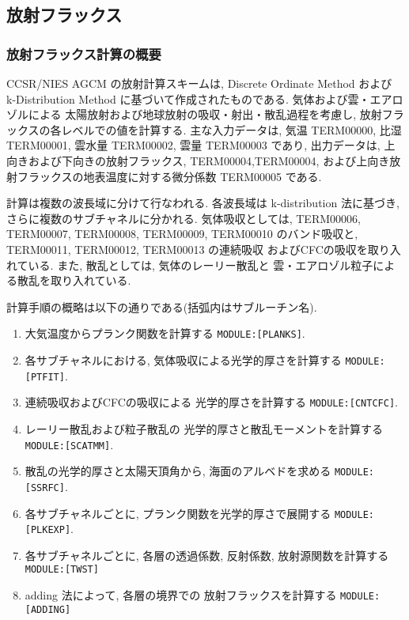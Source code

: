 ﻿\subsection{放射フラックス}

\subsubsection{放射フラックス計算の概要}

CCSR/NIES AGCM の放射計算スキームは, 
Discrete Ordinate Method および 
k-Distribution Method に基づいて作成されたものである.
気体および雲・エアロゾルによる
太陽放射および地球放射の吸収・射出・散乱過程を考慮し,
放射フラックスの各レベルでの値を計算する.
主な入力データは, 気温 TERM00000, 比湿 TERM00001, 雲水量 TERM00002, 雲量 TERM00003 であり,
出力データは, 上向きおよび下向きの放射フラックス, TERM00004,TERM00004,
および上向き放射フラックスの地表温度に対する微分係数
TERM00005 である.

計算は複数の波長域に分けて行なわれる.
各波長域は k-distribution 法に基づき,
さらに複数のサブチャネルに分かれる.
気体吸収としては, 
TERM00006, TERM00007, TERM00008, TERM00009, TERM00010 のバンド吸収と,
TERM00011, TERM00012, TERM00013 の連続吸収
およびCFCの吸収を取り入れている.
また, 散乱としては, 気体のレーリー散乱と
雲・エアロゾル粒子による散乱を取り入れている.

計算手順の概略は以下の通りである(括弧内はサブルーチン名).
%
\begin{enumerate}
\item 大気温度からプランク関数を計算する \texttt{MODULE:[PLANKS]}.
\item 各サブチャネルにおける,
      気体吸収による光学的厚さを計算する \texttt{MODULE:[PTFIT]}.
\item 連続吸収およびCFCの吸収による
      光学的厚さを計算する \texttt{MODULE:[CNTCFC]}.
\item レーリー散乱および粒子散乱の
      光学的厚さと散乱モーメントを計算する \texttt{MODULE:[SCATMM]}.
\item 散乱の光学的厚さと太陽天頂角から, 
      海面のアルベドを求める \texttt{MODULE:[SSRFC]}.
\item 各サブチャネルごとに,
      プランク関数を光学的厚さで展開する \texttt{MODULE:[PLKEXP]}.
\item 各サブチャネルごとに,
      各層の透過係数, 反射係数, 放射源関数を計算する \texttt{MODULE:[TWST]}
\item adding 法によって, 各層の境界での
      放射フラックスを計算する \texttt{MODULE:[ADDING]}
\end{enumerate}

